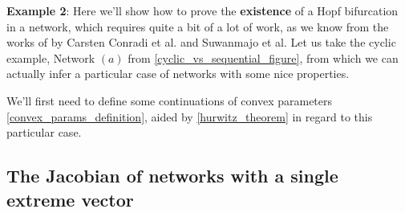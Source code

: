 \textbf{Example 2}:
Here we'll show how to prove the \textbf{existence} of a Hopf bifurcation in a network, which requires quite a bit of a lot of work, as we know from the works of \cite{conradi2024, Suwanmajo2020, Conradi2020} by Carsten Conradi et al. and Suwanmajo et al. Let us take the cyclic example, Network $(a)$ from \ref{cyclic_vs_sequential_figure}, from which we can actually infer a particular case of networks with some nice properties.

We'll first need to define some continuations of convex parameters \ref{convex_params_definition}, aided by \ref{hurwitz_theorem} in regard to this particular case.

\hfill\break
\subsection{The Jacobian of networks with a single extreme vector}\label{jacobian_single_extreme_vector}

